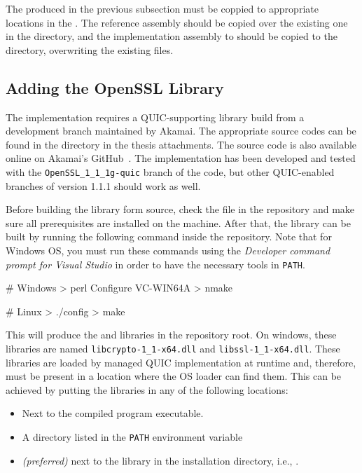 The \SystemNetQuicDll{} produced in the previous subsection must be coppied to appropriate locations
in the . The reference \SystemNetQuicDll{} assembly should be copied over the
existing one in the
 directory, and
the implementation assembly to should be copied to the
 directory, overwriting the
existing files.

\subsection{Adding the OpenSSL Library}\label{sec:06-openssl}

The implementation requires a QUIC-supporting \libopenssl{} library build from a development branch
maintained by Akamai. The appropriate source codes can be found in the 
directory in the thesis attachments. The source code is also available online on Akamai's
GitHub~\cite{AkamaiOpensslGithub}. The implementation has been developed and tested with the
\texttt{OpenSSL_1_1_1g-quic} branch of the code, but other QUIC-enabled branches of \libopenssl{}
version 1.1.1 should work as well.

Before building the \libopenssl{} library form source, check the  file in the
repository and make sure all prerequisites are installed on the machine. After that, the
\libopenssl{} library can be built by running the following command inside the repository. Note that
for Windows OS, you must run these commands using the \textit{Developer command prompt for Visual
  Studio} in order to have the necessary tools in \texttt{PATH}.

\begin{myVerbatim}
# Windows
> perl Configure VC-WIN64A
> nmake

# Linux
> ./config
> make
\end{myVerbatim}

This will produce the  and  libraries in the \libopenssl{}
repository root. On windows, these libraries are named \texttt{libcrypto-1_1-x64.dll} and
\texttt{libssl-1_1-x64.dll}. These libraries are loaded by managed QUIC implementation at runtime
and, therefore, must be present in a location where the OS loader can find them. This can be
achieved by putting the libraries in any of the following locations:

\begin{itemize}

  \item Next to the compiled program executable.

  \item A directory listed in the \texttt{PATH} environment variable

  \item \textit{(preferred)} next to the \SystemNetQuicDll{} library in the \dotnet{} installation
directory, i.e., .

\end{itemize}

